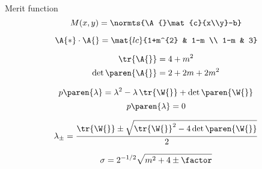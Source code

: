 Merit function
  \begin{equation*}   %
      M(x,y) = \normts{\A{}\mat{c}{x\\y}-b}
  \end{equation*}

  \begin{equation*}   %
      \A{*} \cdot \A{} = 
      \mat{lc}{1+m^{2} & 1-m \\ 1-m & 3}
  \end{equation*}

  \begin{equation*}   %
    \begin{split}
      \tr {\A{}} &= 4 + m^{2} \\
      \det \paren{\A{}} &= 2 + 2m + 2m^{2}
    \end{split}
  \end{equation*}

  \begin{equation*}   %
      p\paren{\lambda} = \lambda^{2} - \lambda \, \tr{\W{}} + \det\paren{\W{}}
  \end{equation*}
  \begin{equation*}   %
      p\paren{\lambda} = 0
  \end{equation*}

  \begin{equation*}   %
      \lambda_{\pm} = \frac{\tr{\W{}} \pm \sqrt{ \tr{\W{}}^{2} - 4 \det\paren{\W{}} } } {2}
  \end{equation*}


  \begin{equation*}   %
      \sigma = 2^{-1/2} \sqrt{m^{2} + 4 \pm \factor}
  \end{equation*}


